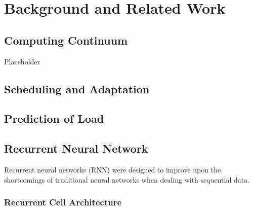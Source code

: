 \chapter{Background and Related Work}
\label{ch:background}

    \section{Computing Continuum}
    \label{sec:computing-continuum-background}

        Placeholder

    \section{Scheduling and Adaptation}
    \label{sec:scheduling-and-adaptation-background}

    \section{Prediction of Load}
    \label{sec:prediction-of-load-background}

    \section{Recurrent Neural Network}
    \label{sec:rnn-background}


        Recurrent neural networks (RNN) were designed to improve upon the shortcomings of traditional neural networks when dealing with sequential data.
        
        
        \subsection{Recurrent Cell Architecture}
        \label{sec:recurrent-cell-architecture-background}

